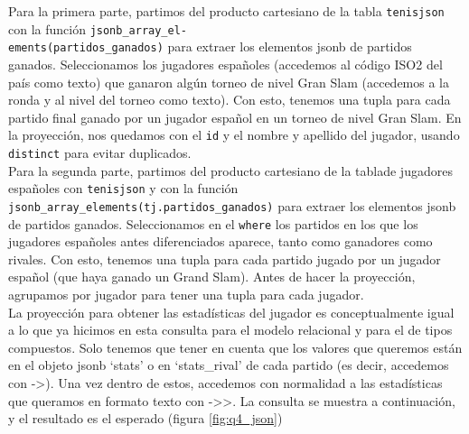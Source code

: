 Para la primera parte, partimos del producto cartesiano de la tabla \texttt{tenisjson} con la función \texttt{jsonb\_array\_el-}\\\texttt{ements(partidos\_ganados)} para extraer los elementos jsonb de partidos ganados. Seleccionamos los jugadores españoles (accedemos al código ISO2 del país como texto) que ganaron algún torneo de nivel Gran Slam (accedemos a la ronda y al nivel del torneo como texto). Con esto, tenemos una tupla para cada partido final ganado por un jugador español en un torneo de nivel Gran Slam. En la proyección, nos quedamos con el \texttt{id} y el nombre y apellido del jugador, usando \texttt{distinct} para evitar duplicados. \\

Para la segunda parte, partimos del producto cartesiano de la tablade jugadores españoles con \texttt{tenisjson} y con la función \texttt{jsonb\_array\_elements(tj.partidos\_ganados)} para extraer los elementos jsonb de partidos ganados. Seleccionamos en el \texttt{where} los partidos en los que los jugadores españoles antes diferenciados aparece, tanto como ganadores como rivales. Con esto, tenemos una tupla para cada partido jugado por un jugador español (que haya ganado un Grand Slam). Antes de hacer la proyección, agrupamos por jugador para tener una tupla para cada jugador. \\

La proyección para obtener las estadísticas del jugador es conceptualmente igual a lo que ya hicimos en esta consulta para el modelo relacional y para el de tipos compuestos. Solo tenemos que tener en cuenta que los valores que queremos están en el objeto jsonb `stats' o en `stats\_rival' de cada partido (es decir, accedemos con ->). Una vez dentro de estos, accedemos con normalidad a las estadísticas que queramos en formato texto con ->>. La consulta se muestra a continuación, y el resultado es el esperado (figura \ref{fig:q4_json})

